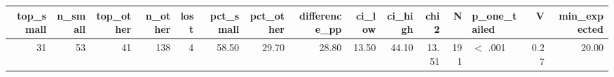 \begin{tabular}{rrrrrrrrrrrrlrr}
  \toprule
top\_small & n\_small & top\_other & n\_other & lost & pct\_small & pct\_other & difference\_pp & ci\_low & ci\_high & chi2 & N & p\_one\_tailed & V & min\_expected \\ 
  \midrule
 31 &  53 &  41 & 138 &   4 & 58.50 & 29.70 & 28.80 & 13.50 & 44.10 & 13.51 & 191 & $<$ .001 & 0.27 & 20.00 \\ 
   \bottomrule
\end{tabular}
